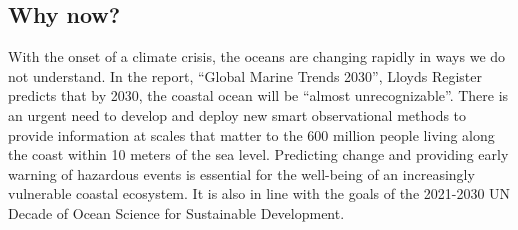 \documentclass[12pt]{article}
\begin{document}

\subsection{Why now?}

With the onset of a climate crisis, the oceans are changing rapidly in
ways we do not understand. In the report, ``Global Marine Trends
2030'', Lloyds Register predicts that by 2030, the coastal ocean will
be ``almost unrecognizable''. There is an urgent need to develop and
deploy new smart observational methods to provide information at
scales that matter to the 600 million people living along the coast
within 10 meters of the sea level.  Predicting change and providing
early warning of hazardous events is essential for the well-being of
an increasingly vulnerable coastal ecosystem. It is also in line with
the goals of the 2021-2030 UN Decade of Ocean Science for Sustainable
Development.


\end{document}
